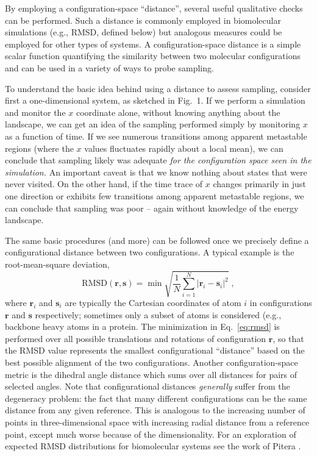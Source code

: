 By employing a configuration-space ``distance'', several useful qualitative checks can be performed.
Such a distance is commonly employed in biomolecular simulations (e.g., RMSD, defined below) but analogous measures could be employed for other types of systems.
A configuration-space distance is a simple scalar function quantifying the similarity between two molecular configurations and can be used in a variety of ways to probe sampling.    

To understand the basic idea behind using a distance to assess sampling, consider first a one-dimensional system, as sketched in Fig.\ 1.  If we perform a simulation and monitor the $x$ coordinate alone, without knowing anything about the landscape, we can get an idea of the sampling performed simply by monitoring $x$ as a function of time.  If we see numerous transitions among apparent metastable regions (where the $x$ values fluctuates rapidly about a local mean), we can conclude that sampling likely was adequate \emph{for the configuration space seen in the simulation.}  An important caveat is that we know nothing about states that were never visited.  On the other hand, if the time trace of $x$ changes primarily in just one direction or exhibits few transitions among apparent metastable regions, we can conclude that sampling was poor -- again without knowledge of the energy landscape.

The same basic procedures (and more) can be followed once we precisely define a configurational distance between two configurations.  A typical example is the root-mean-square deviation,
\begin{equation}
\label{eq:rmsd}
\mathrm{RMSD}(\mathbf{r}, \mathbf{s}) = \min \sqrt{\frac{1}{N}\sum_{i=1}^{N} |\mathbf{r}_i - \mathbf{s}_i|^2} \;,
\end{equation}
where $\mathbf{r}_i$ and $\mathbf{s}_i$ are typically the Cartesian coordinates of atom $i$ in configurations $\mathbf{r}$ and $\mathbf{s}$ respectively; sometimes only a subset of atoms is considered (e.g., backbone heavy atoms in a protein.
The minimization in Eq.\ \eqref{eq:rmsd} is performed over all possible translations and rotations of configuration $\mathbf{r}$, so that the RMSD value represents the smallest configurational ``distance'' based on the best possible alignment of the two configurations.
Another configuration-space metric is the dihedral angle distance which sums over all distances for pairs of selected angles.
Note that configurational distances \emph{generally} suffer from the degeneracy problem: the fact that many different configurations can be the same distance from any given reference.  This is analogous to
the increasing number of points in three-dimensional space
with increasing radial distance from a reference point, except
much worse because of the dimensionality.  For an
exploration of expected RMSD distributions for biomolecular
systems see the work of Pitera \cite{Pitera2014}.

